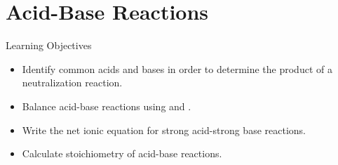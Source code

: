 \documentclass[notes=only]{beamer}
\begin{document}
%
%

\section{Acid-Base Reactions}

\begin{frame}{Learning Objectives}
	\begin{itemize}
		\item Identify common acids and bases in order to determine the product
			of a neutralization reaction.
		\item Balance acid-base reactions using  and \Hyd{}.
		\item Write the net ionic equation for strong acid-strong base
			reactions.
		\item Calculate stoichiometry of acid-base reactions.
	\end{itemize}
\end{frame}
\end{document}
